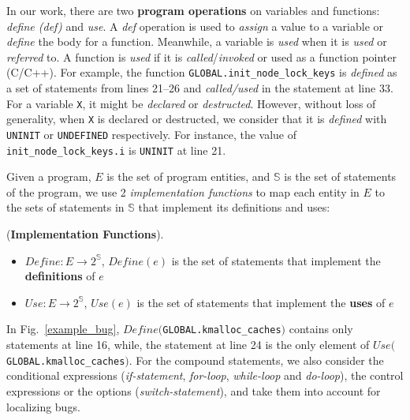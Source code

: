In our work, there are two {\bf program operations} on variables and
functions: \textit{define (def)} and \textit{use}. A \textit{def}
operation is used to \textit{assign} a value to a variable or
\textit{define} the body for a function. Meanwhile, a variable is
\textit{used} when it is \textit{used} or \textit{referred} to. A
function is \textit{used} if it is \textit{called}/\textit{invoked} or
used as a function pointer (C/C++). For example, the function
\texttt{GLOBAL.init\_node\_lock\_keys} is \textit{defined} as a set of
statements from lines 21--26 and \textit{called/used} in the statement
at line 33. For a variable \texttt{X}, it might be \textit{declared}
or \textit{destructed}. However, without loss of generality, when
\texttt{X} is declared or destructed, we consider that it is
\textit{defined} with \texttt{UNINIT} or \texttt{UNDEFINED}
respectively. For instance, the value of
\texttt{init\_node\_lock\_keys.i} is \texttt{UNINIT} at line 21.
%

Given a program, $E$ is the set of program entities, and $\mathbb{S}$
is the set of statements of the program, we use 2
\textit{implementation functions} to map each entity in $E$ to the
sets of statements in $\mathbb{S}$ that implement its definitions and
uses:
\begin{Definition}{({\bf Implementation Functions}).}
\begin{itemize}
  \item $Define:E \to 2^\mathbb{S}$, $Define(e)$ is the set of statements that 
  implement the {\bf definitions} of $e$
  \item $Use:E \to 2^\mathbb{S}$, $Use(e)$ is the set of statements that 
  implement the {\bf uses} of $e$
\end{itemize}
\end{Definition}
In Fig.~\ref{example_bug},
$Define($\texttt{GLOBAL.kmalloc\_caches}$)$ contains only statements
at line 16, while, the statement at line 24 is the only element of
$Use($\texttt{GLOBAL.kmalloc\_caches}$)$. For the compound
statements, we also consider the conditional expressions
(\textit{if-statement}, \textit{for-loop}, \textit{while-loop} and
\textit{do-loop}), the control expressions or the options
(\textit{switch-statement}), and take them into account for localizing
bugs.
%

%

%

